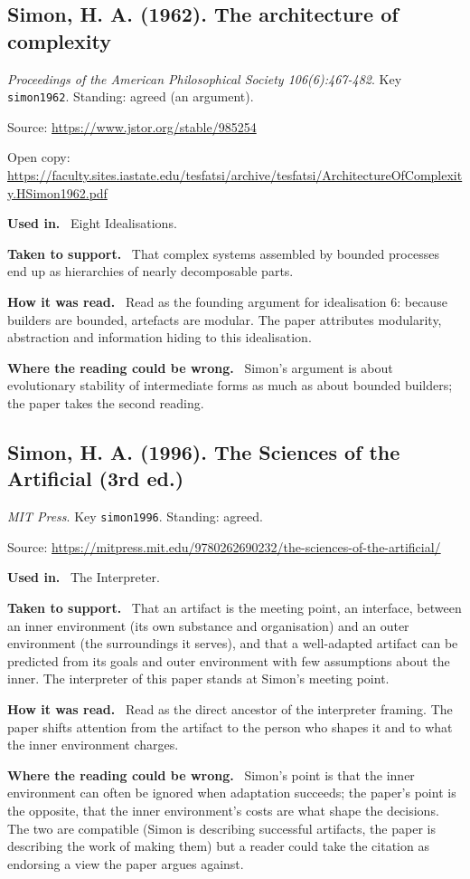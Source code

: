 \documentclass[11pt,oneside]{article}
\newcommand{\field}[1]{\par\noindent\textbf{\color{accent}#1.}\ }
\begin{document}
\hypertarget{src:simon1962}{}
\subsection*{Simon, H. A. (1962). The architecture of complexity}
\noindent\small\emph{Proceedings of the American Philosophical Society 106(6):467-482}. Key \texttt{simon1962}. Standing: agreed (an argument).
\par\noindent\small Source: \url{https://www.jstor.org/stable/985254}
\par\noindent\small Open copy: \url{https://faculty.sites.iastate.edu/tesfatsi/archive/tesfatsi/ArchitectureOfComplexity.HSimon1962.pdf}
\normalsize
\field{Used in} Eight Idealisations.
\field{Taken to support} That complex systems assembled by bounded processes end up as hierarchies of nearly decomposable parts.
\field{How it was read} Read as the founding argument for idealisation 6: because builders are bounded, artefacts are modular. The paper attributes modularity, abstraction and information hiding to this idealisation.
\field{Where the reading could be wrong} Simon's argument is about evolutionary stability of intermediate forms as much as about bounded builders; the paper takes the second reading.

\hypertarget{src:simon1996}{}
\subsection*{Simon, H. A. (1996). The Sciences of the Artificial (3rd ed.)}
\noindent\small\emph{MIT Press}. Key \texttt{simon1996}. Standing: agreed.
\par\noindent\small Source: \url{https://mitpress.mit.edu/9780262690232/the-sciences-of-the-artificial/}
\normalsize
\field{Used in} The Interpreter.
\field{Taken to support} That an artifact is the meeting point, an interface, between an inner environment (its own substance and organisation) and an outer environment (the surroundings it serves), and that a well-adapted artifact can be predicted from its goals and outer environment with few assumptions about the inner. The interpreter of this paper stands at Simon's meeting point.
\field{How it was read} Read as the direct ancestor of the interpreter framing. The paper shifts attention from the artifact to the person who shapes it and to what the inner environment charges.
\field{Where the reading could be wrong} Simon's point is that the inner environment can often be ignored when adaptation succeeds; the paper's point is the opposite, that the inner environment's costs are what shape the decisions. The two are compatible (Simon is describing successful artifacts, the paper is describing the work of making them) but a reader could take the citation as endorsing a view the paper argues against.
\end{document}
